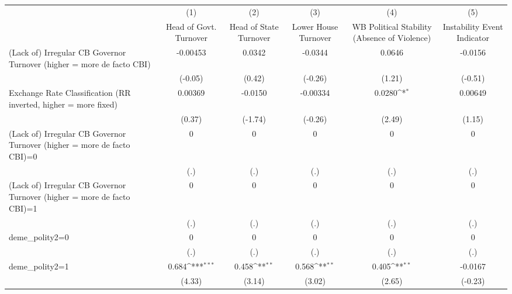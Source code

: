{
\def\sym#1{\ifmmode^{#1}\else\(^{#1}\)\fi}
\begin{tabular*}{\linewidth}{@{\hskip\tabcolsep\extracolsep\fill}l*{5}{c}}
\hline\hline
                &\multicolumn{1}{c}{(1)}&\multicolumn{1}{c}{(2)}&\multicolumn{1}{c}{(3)}&\multicolumn{1}{c}{(4)}&\multicolumn{1}{c}{(5)}\\
                &\multicolumn{1}{c}{Head of Govt. Turnover}&\multicolumn{1}{c}{Head of State Turnover}&\multicolumn{1}{c}{Lower House Turnover}&\multicolumn{1}{c}{WB Political Stability (Absence of Violence)}&\multicolumn{1}{c}{Instability Event Indicator}\\
\hline
(Lack of) Irregular CB Governor Turnover (higher = more de facto CBI)& -0.00453         &   0.0342         &  -0.0344         &   0.0646         &  -0.0156         \\
                &  (-0.05)         &   (0.42)         &  (-0.26)         &   (1.21)         &  (-0.51)         \\
[1em]
Exchange Rate Classification (RR inverted, higher = more fixed)&  0.00369         &  -0.0150         & -0.00334         &   0.0280\sym{*}  &  0.00649         \\
                &   (0.37)         &  (-1.74)         &  (-0.26)         &   (2.49)         &   (1.15)         \\
[1em]
(Lack of) Irregular CB Governor Turnover (higher = more de facto CBI)=0&        0         &        0         &        0         &        0         &        0         \\
                &      (.)         &      (.)         &      (.)         &      (.)         &      (.)         \\
[1em]
(Lack of) Irregular CB Governor Turnover (higher = more de facto CBI)=1&        0         &        0         &        0         &        0         &        0         \\
                &      (.)         &      (.)         &      (.)         &      (.)         &      (.)         \\
[1em]
deme\_polity2=0  &        0         &        0         &        0         &        0         &        0         \\
                &      (.)         &      (.)         &      (.)         &      (.)         &      (.)         \\
[1em]
deme\_polity2=1  &    0.684\sym{***}&    0.458\sym{**} &    0.568\sym{**} &    0.405\sym{**} &  -0.0167         \\
                &   (4.33)         &   (3.14)         &   (3.02)         &   (2.65)         &  (-0.23)         \\

\end{tabular*}}
